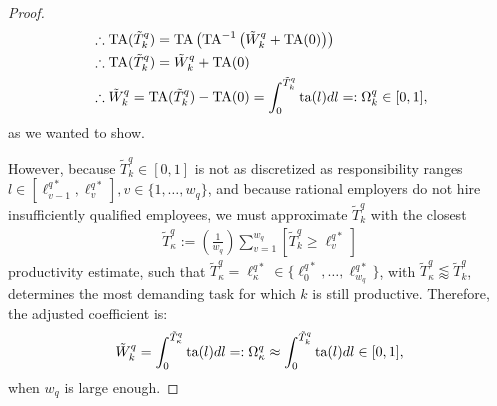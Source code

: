 \documentclass[hidelinks, nonatbib]{elsarticle}
\begin{document}
\begin{corollary}
\begin{proof}
\begin{align}
            &
            \therefore
            \text{TA}
            (
                \tilde{T}_{k}^{q}
            )
            =
            \text{TA}
            \left(
                \text{TA}^{-1}
                \left(
                    \tilde{W}_{k}^{q}
                    +
                    \text{TA}(0)
                \right)
            \right)
            \\
            &
            \therefore
            \text{TA}
            (
                \tilde{T}_{k}^{q}
            )
            =
            \tilde{W}_{k}^{q}
            +
            \text{TA}(0)
            \\
            &
            \therefore
            \tilde{W}_{k}^{q}
            =
            \text{TA}
            (
                \tilde{T}_{k}^{q}
            )
            -
            \text{TA}(0)
            =
            \int_{0}^{\tilde{T}_{k}^{q}}
            \text{ta}(l)
            dl
            =:
            \Omega_{k}^{q}
            \in 
            [0,1]
            ,
        \end{align}
        as we wanted to show.
        
        However, because $\tilde{T}_{k}^{q} \in [0,1]$ is not as discretized as responsibility ranges $l \in [\ell_{v-1}^{q*},\ell_{v}^{q*}], v \in \{1, \dots, w_q\}$, and because rational employers do not hire insufficiently qualified employees, we must approximate $\tilde{T}_{k}^{q}$ with the closest 
        \begin{gather}
            \tilde{T}_{\kappa}^{q}
            :=
            \left(
                \frac{1}{w_q}
            \right)
            \sum_{v=1}^{w_q}
            \left[
                \tilde{T}_{k}^{q}
                \geq
                \ell_{v}^{q*}
            \right]
        \end{gather}
        productivity estimate, such that $\tilde{T}_{\kappa}^{q} = \ell_{\kappa}^{q*} \in \{\ell_{0}^{q*}, \dots, \ell_{w_q}^{q*}\}$, with $\tilde{T}_{\kappa}^{q} \lessapprox \tilde{T}_{k}^{q}$, determines the most demanding task for which $k$ is still productive. Therefore, the adjusted coefficient is:
        \begin{gather}
            \tilde{W}_{k}^{q}
            =
            \int_{0}^{\tilde{T}_{\kappa}^{q}}
            \text{ta}(l)
            dl
            =:
            \Omega_{\kappa}^{q}
            \approx
            \int_{0}^{\tilde{T}_{k}^{q}}
            \text{ta}(l)
            dl
            \in 
            [0,1]
            ,
        \end{gather}
        when $w_q$ is large enough.
        

\end{proof}
\end{corollary}
\end{document}
